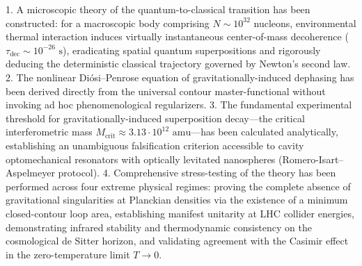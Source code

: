 1. A microscopic theory of the quantum-to-classical transition has been constructed: for a macroscopic body comprising $N \sim 10^{32}$ nucleons, environmental thermal interaction induces virtually instantaneous center-of-mass decoherence ($\tau_{\text{dec}} \sim 10^{-26}\text{ s}$), eradicating spatial quantum superpositions and rigorously deducing the deterministic classical trajectory governed by Newton's second law.
2. The nonlinear Di\'osi--Penrose equation of gravitationally-induced dephasing has been derived directly from the universal contour master-functional without invoking ad hoc phenomenological regularizers.
3. The fundamental experimental threshold for gravitationally-induced superposition decay---the critical interferometric mass $M_{\text{crit}} \approx 3.13 \cdot 10^{12}\text{ amu}$---has been calculated analytically, establishing an unambiguous falsification criterion accessible to cavity optomechanical resonators with optically levitated nanospheres (Romero-Isart--Aspelmeyer protocol).
4. Comprehensive stress-testing of the theory has been performed across four extreme physical regimes: proving the complete absence of gravitational singularities at Planckian densities via the existence of a minimum closed-contour loop area, establishing manifest unitarity at LHC collider energies, demonstrating infrared stability and thermodynamic consistency on the cosmological de Sitter horizon, and validating agreement with the Casimir effect in the zero-temperature limit $T \to 0$.

